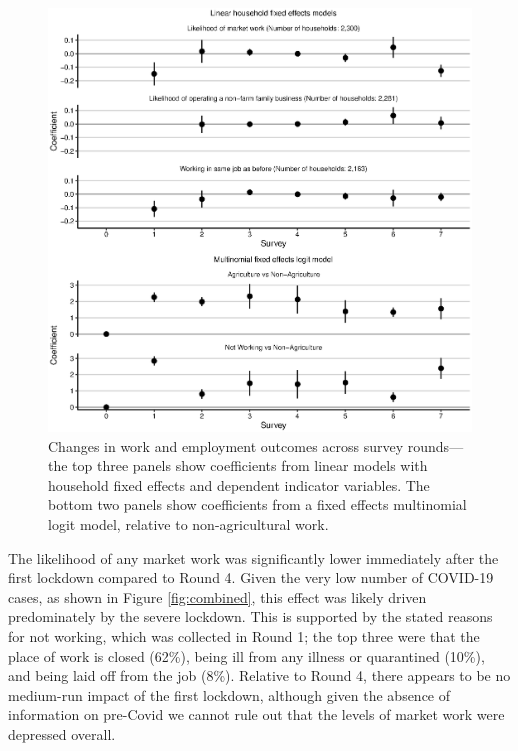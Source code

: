 \documentclass{wber}
\begin{document}
\begin{figure}
\caption{Changes in work and employment outcomes across survey rounds---the top 
three panels show coefficients from linear models with household
fixed effects and dependent indicator variables. The bottom two panels
show coefficients from a fixed effects multinomial logit model, relative
to non-agricultural work.}\label{fig:work_employment}
\begin{center}
\includegraphics[width=\linewidth, keepaspectratio]{./eps/fig_08.eps}
\end{center}
\end{figure}

The likelihood of any market work was significantly lower immediately
after the first lockdown compared to Round 4. Given the very low number
of COVID-19 cases, as shown in Figure \ref{fig:combined}, this effect was
likely driven predominately by the severe lockdown. This is supported by
the stated reasons for not working, which was collected in Round 1; the
top three were that the place of work is closed (62\%), being ill from
any illness or quarantined (10\%), and being laid off from the job
(8\%). Relative to Round 4, there appears to be no medium-run impact of
the first lockdown, although given the absence of information on
pre-Covid we cannot rule out that the levels of market work were
depressed overall.
\end{document}

